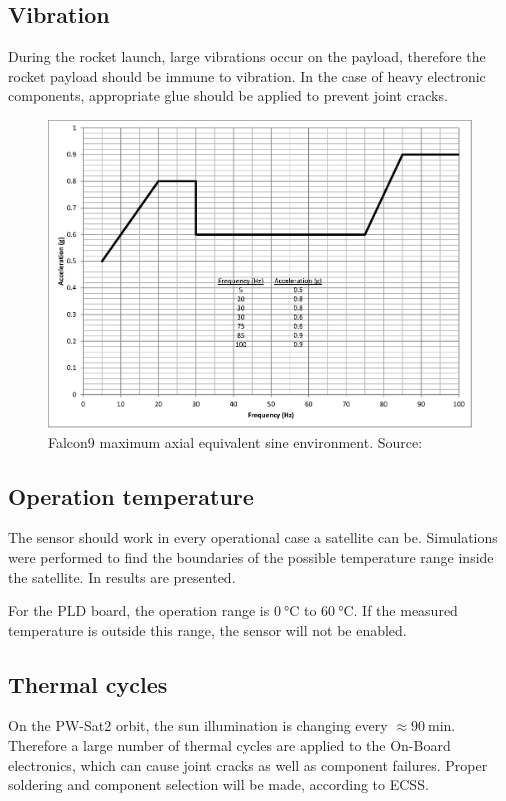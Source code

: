     \subsection{Vibration}
        During the rocket launch, large vibrations occur on the payload, therefore the rocket payload should be immune to vibration. In the case of heavy electronic components, appropriate glue should be applied to prevent joint cracks.
        \begin{figure}[H]
            \centering
            \includegraphics[width=0.5\paperwidth]{img/04/Falcon9_vibration.eps}
            \caption{Falcon9 maximum axial equivalent sine environment. Source: \cite{Falcon9_user_manual}}
            \label{Falcon9_vibration}
        \end{figure}


    \subsection{Operation temperature}
        The sensor should work in every operational case a satellite can be. Simulations were performed to find the boundaries of the  possible temperature range inside the satellite.    In \cite{PWSAT_TCS_CDR} results are presented.

        For the PLD board, the operation range is $\SI{0}{\degreeCelsius}$ to $\SI{60}{\degreeCelsius}$. If the measured temperature is outside this range, the sensor will not be enabled.


    \subsection{Thermal cycles}
        On the PW-Sat2 orbit, the sun illumination is changing every $\approx \SI{90}{\minute}$. Therefore a large number of thermal cycles are applied to the On-Board electronics, which can cause joint cracks as well as component failures. Proper soldering and component selection will be made, according to ECSS.

